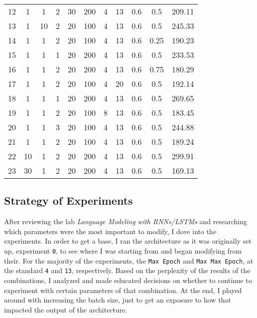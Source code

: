 \documentclass[a4paper]{article}
\begin{document}
\begin{table}[h]
\begin{center}
{\begin{tabular}{lccccccccc||c}
    12 & 1 & 1 & 2 & 30 & 200 & 4 & 13 & 0.6 & 0.5 & 209.11 \\
    13 & 1 & 10 & 2 & 20 & 100 & 4 & 13 & 0.6 & 0.5 & 245.33 \\
    14 & 1 & 1 & 2 & 20 & 100 & 4 & 13 & 0.6 & 0.25 & 190.23 \\
    15 & 1 & 1 & 1 & 20 & 200 & 4 & 13 & 0.6 & 0.5 & 233.53 \\
    16 & 1 & 1 & 2 & 20 & 200 & 4 & 13 & 0.6 & 0.75 & 180.29 \\
    17 & 1 & 1 & 2 & 20 & 100 & 4 & 20 & 0.6 & 0.5 & 192.14 \\
    18 & 1 & 1 & 1 & 20 & 200 & 4 & 13 & 0.6 & 0.5 & 269.65 \\
    19 & 1 & 1 & 2 & 20 & 100 & 8 & 13 & 0.6 & 0.5 & 183.45 \\
    20 & 1 & 1 & 3 & 20 & 100 & 4 & 13 & 0.6 & 0.5 & 244.88 \\
    21 & 1 & 1 & 2 & 20 & 100 & 4 & 13 & 0.6 & 0.5 & 189.24 \\
    22 & 10 & 1 & 2 & 20 & 200 & 4 & 13 & 0.6 & 0.5 & 299.91 \\
    23 & 30 & 1 & 2 & 20 & 200 & 4 & 13 & 0.6 & 0.5 & 169.13  \\
    \hline \hline
  \end{tabular}}
 \end{center}
\end{table}

\subsection{Strategy of Experiments}
After reviewing the lab \textit{Language Modeling with RNNs/LSTMs} and researching which parameters were the most important to modify, I dove into the experiments. In order to get a base, I ran the architecture as it was originally set up, experiment \texttt{0}, to see where I was starting from and began modifying from their. For the majority of the experiments, the \texttt{Max Epoch} and \texttt{Max Max Epoch}, at the standard \texttt{4} and \texttt{13}, respectively. Based on the perplexity of the results of the combinations, I analyzed and made educated decisions on whether to continue to experiment with certain parameters of that combination. At the end, I played around with increasing the batch size, just to get an exposure to how that impacted the output of the architecture.
\end{document}
